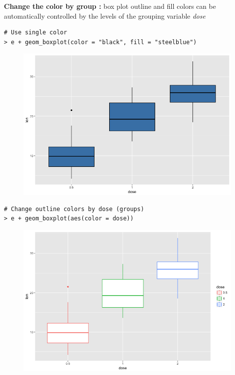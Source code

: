 \textbf{Change the color by group :} box plot outline and fill colors can be automatically controlled by the levels of the grouping variable \textit{dose}
\begin{lstlisting}[language=html]
# Use single color
> e + geom_boxplot(color = "black", fill = "steelblue")
\end{lstlisting}
\begin{figure}[H]\begin{center}\includegraphics[scale=1 ]{ilu/bg77.png}\end{center}\end{figure}
\begin{lstlisting}[language=html]
# Change outline colors by dose (groups)
> e + geom_boxplot(aes(color = dose))
\end{lstlisting}
\begin{figure}[H]\begin{center}\includegraphics[scale=1 ]{ilu/bg78.png}\end{center}\end{figure}
